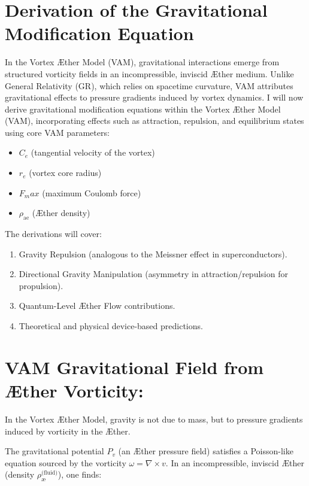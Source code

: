 \section{Derivation of the Gravitational Modification Equation}


In the Vortex Æther Model (VAM), gravitational interactions emerge from structured vorticity fields in an incompressible, inviscid Æther medium. Unlike General Relativity (GR), which relies on spacetime curvature, VAM attributes gravitational effects to pressure gradients induced by vortex dynamics. I will now derive gravitational modification equations within the Vortex Æther Model (VAM), incorporating effects such as attraction, repulsion, and equilibrium states using core VAM parameters:

\begin{itemize}
    \item $C_e$ (tangential velocity of the vortex)
    \item $r_e$ (vortex core radius)
    \item $F_max$ (maximum Coulomb force)
    \item $\rho_\text{ae}$ (Æther density)
\end{itemize}

The derivations will cover:

\begin{enumerate}
    \item Gravity Repulsion (analogous to the Meissner effect in superconductors).
    \item Directional Gravity Manipulation (asymmetry in attraction/repulsion for propulsion).
    \item Quantum-Level Æther Flow contributions.
    \item Theoretical and physical device-based predictions.
\end{enumerate}


\section*{VAM Gravitational Field from Æther Vorticity:}
In the Vortex Æther Model, gravity is not due to mass, but to pressure gradients induced by vorticity in the Æther.

The gravitational potential $P_v$ (an Æther pressure field) satisfies a Poisson-like equation sourced by the vorticity $\omega=\nabla\times v$. In an incompressible, inviscid Æther (density $\rho_{\text{\ae}}^{\text{(fluid)}}$), one finds:

